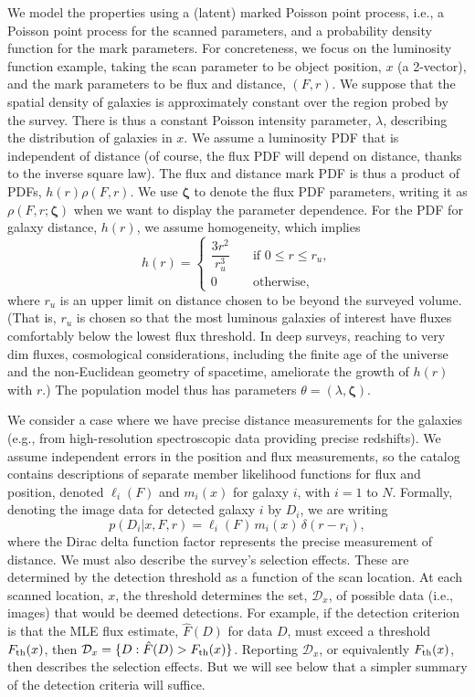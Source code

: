 \documentclass[12pt]{article}
\numberwithin{equation}{section}
\numberwithin{figure}{section}
\numberwithin{table}{section}
\newcommand{\ppar}{\theta}  %
\newcommand{\rhopar}{\boldsymbol{\zeta}}
\newcommand{\dtxns}{\mathcal{D}}
\newcommand{\Fth}{F_{\rm th}}
\begin{document}
We model the properties using a (latent) marked Poisson point process, i.e., a Poisson point process for the scanned parameters, and a probability density function for the mark parameters.
For concreteness, we focus on the luminosity function example, taking the scan parameter to be object position, $x$ (a 2-vector), and the mark parameters to be flux and distance, $(F, r)$.
We suppose that the spatial density of galaxies is approximately constant over the region probed by the survey.
There is thus a constant Poisson intensity parameter, $\lambda$, describing the distribution of galaxies in $x$.
We assume a luminosity PDF that is independent of distance (of course, the flux PDF will depend on distance, thanks to the inverse square law).
The flux and distance mark PDF is thus a product of PDFs, $h(r)\rho(F,r)$.
We use $\rhopar$ to denote the flux PDF parameters, writing it as $\rho(F,r; \rhopar)$ when we want to display the parameter dependence.
For the PDF for galaxy distance, $h(r)$, we assume homogeneity, which implies
\begin{equation}\label{eq:distPDF}
h(r) = 
\begin{cases} 
    \dfrac{3r^{2}}{r_u^{3}} & \quad \text{if } 0\leq r\leq r_u,\\
    0 & \quad \text{otherwise},
\end{cases} 
\end{equation}
where $r_u$ is an upper limit on distance chosen to be beyond the surveyed volume.
(That is, $r_u$ is chosen so that the most luminous galaxies of interest have fluxes comfortably below the lowest flux threshold.
In deep surveys, reaching to very dim fluxes, cosmological considerations, including the finite age of the universe and the non-Euclidean geometry of spacetime, ameliorate the growth of $h(r)$ with $r$.)
The population model thus has parameters $\ppar = (\lambda,\rhopar)$.

We consider a case where we have precise distance measurements for the galaxies (e.g., from high-resolution spectroscopic data providing precise redshifts).
We assume independent errors in the position and flux measurements, so the catalog contains descriptions of separate member likelihood functions for flux and position, denoted $\ell_i(F)$ and $m_i(x)$ for galaxy $i$, with $i=1$ to $N$.
Formally, denoting the image data for detected galaxy $i$ by $D_i$, we are writing
\begin{equation}\label{eq:xFr-like}
p(D_i|x,F,r) = \ell_i(F)\, m_i(x)\, \delta(r - r_i),
\end{equation}
where the Dirac delta function factor represents the precise measurement of distance.
We must also describe the survey's selection effects.
These are determined by the detection threshold as a function of the scan location.
At each scanned location, $x$, the threshold determines the set, $\dtxns_x$, of possible data (i.e., images) that would be deemed detections.
For example, if the detection criterion is that the MLE flux estimate, $\hat F(D)$ for data $D$, must exceed a threshold $\Fth(x)$, then $\dtxns_x = \{D : \hat{F}(D) > \Fth(x)\}$.
Reporting $\dtxns_x$, or equivalently $\Fth(x)$, then describes the selection effects.
But we will see below that a simpler summary of the detection criteria will suffice.
\end{document}
